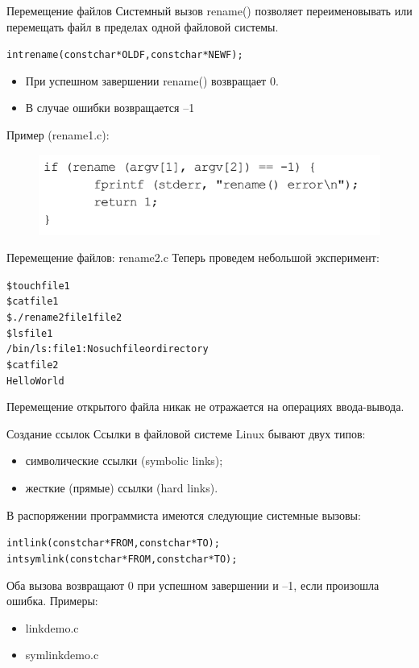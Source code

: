 \documentclass{beamer}
\begin{document}
\begin{frame}[fragile]{Перемещение файлов}
Системный вызов rename() позволяет переименовывать или перемещать файл в
пределах одной файловой системы.
\begin{alltt}
int rename (const char * OLDF, const char * NEWF);
\end{alltt}
\begin{itemize}
\item При успешном завершении rename() возвращает 0. 
\item В случае ошибки возвращается –1
\end{itemize}
Пример (rename1.c):
\begin{figure}[h]
\centering
\includegraphics[scale=0.75]{images/lec10-pic02.png}
\end{figure}
\end{frame}

\begin{frame}[fragile]{Перемещение файлов: rename2.c}
Теперь проведем небольшой эксперимент:
\begin{alltt}
\$ touch file1
\$ cat file1
\$ ./rename2 file1 file2
\$ ls file1
/bin/ls: file1: No such file or directory
\$ cat file2
Hello World
\end{alltt}
Перемещение открытого файла никак не отражается на операциях ввода-вывода.
\end{frame}

\begin{frame}[fragile]{Создание ссылок}
Ссылки в файловой системе Linux бывают двух типов:
\begin{itemize}
\item символические ссылки (symbolic links);
\item жесткие (прямые) ссылки (hard links).
\end{itemize}
В распоряжении программиста имеются следующие системные вызовы:
\begin{alltt}
int link (const char * FROM, const char * TO);
int symlink (const char * FROM, const char * TO);
\end{alltt}
Оба вызова возвращают 0 при успешном завершении и –1, если произошла ошибка.
Примеры: 
\begin{itemize}
\item linkdemo.c
\item symlinkdemo.c
\end{itemize}
\end{frame}
\end{document}
